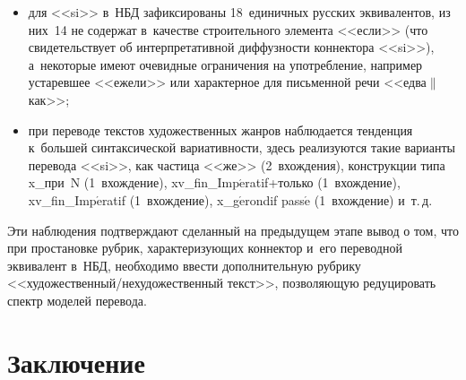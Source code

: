 \begin{multicols}{2}
\begin{itemize}
  \item для <<si>> в~НБД зафиксированы 18~единичных русских 
эквивалентов, из них~14 не содержат в~качестве строительного элемента 
<<если>> (что свидетельствует об интерпретативной диффузности 
коннектора <<si>>), а~некоторые имеют очевидные ограничения на 
употребление, например устаревшее <<ежели>> или характерное для 
письменной речи <<едва$\|$как>>;
  \item  при переводе текстов художественных жан\-ров наблюдается 
тенденция к~большей синтаксической вариативности, здесь реализуются 
такие варианты перевода <<si>>, как частица <<же>> (2~вхож\-де\-ния), 
конструкции типа x\_при~N (1~вхож\-де\-ние), 
xv\_fin\_Imp$\acute{\mbox{e}}$ratif+только (1~вхож\-де\-ние),  
xv\_fin\_Imp$\acute{\mbox{e}}$ratif (1~вхож\-де\-ние), 
x\_g$\acute{\mbox{e}}$rondif pass$\acute{\mbox{e}}$ (1~вхож\-де\-ние) и~т.\,д.
  \end{itemize}
  
  Эти наблюдения подтверждают сделанный на предыдущем этапе вывод о 
том, что при простановке рубрик, характеризующих коннектор и~его 
переводной эквивалент в~НБД, необходимо ввести дополнительную рубрику  
<<ху\-до\-жест\-вен\-ный/не\-ху\-до\-жест\-вен\-ный текст>>, позволяющую 
редуцировать спектр моделей перевода.

\vspace*{-9pt}
  
  \section{Заключение}
  
  \vspace*{-3pt}
  

\end{multicols}
